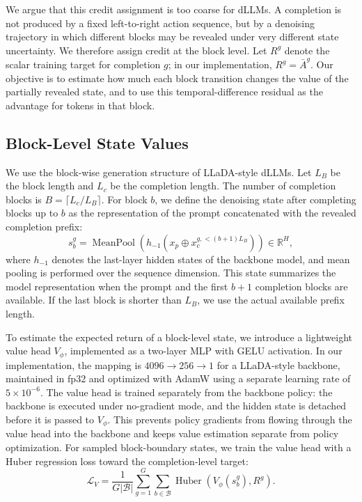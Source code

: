 \documentclass[letterpaper]{article}
\begin{document}
We argue that this credit assignment is too coarse for dLLMs. A completion is not produced by a fixed left-to-right action sequence, but by a denoising trajectory in which different blocks may be revealed under very different state uncertainty. We therefore assign credit at the block level. Let $R^g$ denote the scalar training target for completion $g$; in our implementation, $R^g=\bar{A}^g$. Our objective is to estimate how much each block transition changes the value of the partially revealed state, and to use this temporal-difference residual as the advantage for tokens in that block.

\subsection{Block-Level State Values}

We use the block-wise generation structure of LLaDA-style dLLMs. Let $L_B$ be the block length and $L_c$ be the completion length. The number of completion blocks is $B=\lceil L_c/L_B \rceil$. For block $b$, we define the denoising state after completing blocks up to $b$ as the representation of the prompt concatenated with the revealed completion prefix:
\begin{equation}
 s_b^g = \operatorname{MeanPool}\left(
 h_{-1}\left(x_p \oplus x_c^{g,< (b+1)L_B}\right)
 \right) \in \mathbb{R}^{H},
\end{equation}
where $h_{-1}$ denotes the last-layer hidden states of the backbone model, and mean pooling is performed over the sequence dimension. This state summarizes the model representation when the prompt and the first $b+1$ completion blocks are available. If the last block is shorter than $L_B$, we use the actual available prefix length.

To estimate the expected return of a block-level state, we introduce a lightweight value head $V_\phi$, implemented as a two-layer MLP with GELU activation. In our implementation, the mapping is $4096 \rightarrow 256 \rightarrow 1$ for a LLaDA-style backbone, maintained in fp32 and optimized with AdamW using a separate learning rate of $5\times10^{-6}$. The value head is trained separately from the backbone policy: the backbone is executed under no-gradient mode, and the hidden state is detached before it is passed to $V_\phi$. This prevents policy gradients from flowing through the value head into the backbone and keeps value estimation separate from policy optimization. For sampled block-boundary states, we train the value head with a Huber regression loss toward the completion-level target:
\begin{equation}
 \mathcal{L}_{V}
 = \frac{1}{G|\mathcal{B}|}
 \sum_{g=1}^{G}\sum_{b\in\mathcal{B}}
 \operatorname{Huber}\left(V_\phi(s_b^g), R^g\right).
\end{equation}
\end{document}
